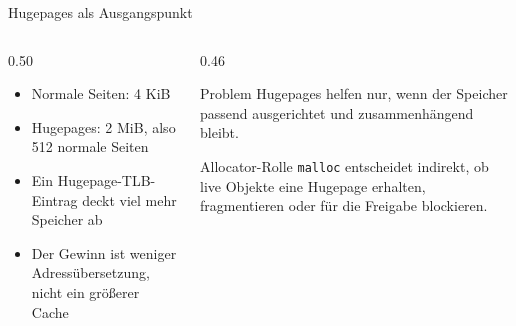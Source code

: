 \documentclass[aspectratio=169,10pt]{beamer}
\newcommand{\smallcode}[1]{\texttt{\footnotesize #1}}
\begin{document}
\begin{frame}{Hugepages als Ausgangspunkt}
\begin{columns}[T,totalwidth=\textwidth]
  \begin{column}{0.50\textwidth}
    \begin{itemize}
      \item Normale Seiten: 4 KiB
      \item Hugepages: 2 MiB, also 512 normale Seiten
      \item Ein Hugepage-TLB-Eintrag deckt viel mehr Speicher ab
      \item Der Gewinn ist weniger Adress\"ubersetzung, nicht ein gr\"o{\ss}erer Cache
    \end{itemize}
  \end{column}
  \begin{column}{0.46\textwidth}
    \begin{block}{Problem}
      Hugepages helfen nur, wenn der Speicher passend ausgerichtet und
      zusammenh\"angend bleibt.
    \end{block}
    \vspace{0.55em}
    \begin{block}{Allocator-Rolle}
      \smallcode{malloc} entscheidet indirekt, ob live Objekte eine Hugepage
      erhalten, fragmentieren oder f\"ur die Freigabe blockieren.
    \end{block}
  \end{column}
\end{columns}
\end{frame}
\end{document}
